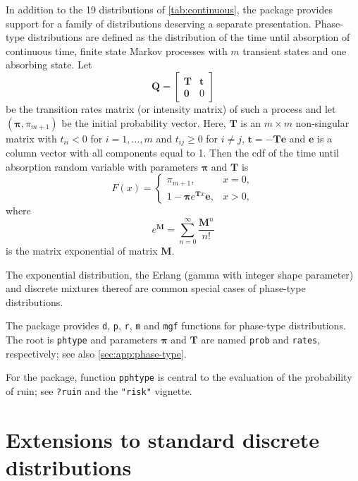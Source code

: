 \documentclass[x11names]{article}
\newcommand{\mat}[1]{\mathbold{#1}} %
\newcommand{\code}[1]{\texttt{#1}}
\begin{document}
In addition to the 19 distributions of \autoref{tab:continuous},
the package provides support for a family of distributions deserving a
separate presentation. Phase-type distributions \citep{Neuts_81} are
defined as the distribution of the time until absorption of continuous
time, finite state Markov processes with $m$ transient states and one
absorbing state. Let
\begin{equation}
  \label{eq:Markov-transition-matrix}
  \mat{Q} =
  \begin{bmatrix}
    \mat{T} & \mat{t} \\
    \mat{0} & 0
  \end{bmatrix}
\end{equation}
be the transition rates matrix (or intensity matrix) of such a process
and let $(\mat{\pi}, \pi_{m + 1})$ be the initial probability vector.
Here, $\mat{T}$ is an $m \times m$ non-singular matrix with $t_{ii} <
0$ for $i = 1, \dots, m$ and $t_{ij} \geq 0$ for $i \neq j$, $\mat{t}
= - \mat{T} \mat{e}$ and $\mat{e}$ is a column vector with all
components equal to 1. Then the cdf of the time until absorption
random variable with parameters $\mat{\pi}$ and $\mat{T}$ is
\begin{equation}
  \label{eq:cdf-phtype}
  F(x) =
  \begin{cases}
    \pi_{m + 1}, & x = 0, \\
    1 - \mat{\pi} e^{\mat{T} x} \mat{e}, & x > 0,
  \end{cases}
\end{equation}
where
\begin{equation}
  \label{eq:matrix-exponential}
  e^{\mat{M}} = \sum_{n = 0}^\infty \frac{\mat{M}^n}{n!}
\end{equation}
is the matrix exponential of matrix $\mat{M}$.

The exponential distribution, the Erlang (gamma with integer shape
parameter) and discrete mixtures thereof are common special cases of
phase-type distributions.

The package provides \code{d}, \code{p}, \code{r}, \code{m} and
\code{mgf} functions for phase-type distributions. The root is
\code{phtype} and parameters $\mat{\pi}$ and $\mat{T}$ are named
\code{prob} and \code{rates}, respectively; see also
\autoref{sec:app:phase-type}.

For the package, function \code{pphtype} is central to the evaluation
of the probability of ruin; see \code{?ruin} and the \code{"risk"}
vignette.


\section{Extensions to standard discrete distributions}
\label{sec:discrete}
\end{document}
